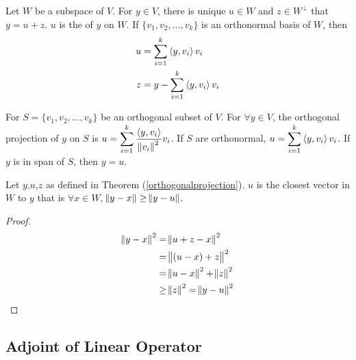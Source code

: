 \begin{theorem}\label{orthogonalprojection}
    Let $W$ be a subspace of $V$. For $y \in V$, there is unique $u \in W$ and $z \in W^\bot$ that $y = u + z$. $u$ is the  of $y$ on $W$. If $\{v_1, v_2, \dots, v_k \}$ is an orthonormal basis of $W$, then 
    \begin{equation}
        \begin{aligned}
            u &= \sum_{i=1}^k \left\langle \displaystyle y, v_i \right\rangle v_i \\
            z &= y -   \sum_{i=1}^k \left\langle \displaystyle y, v_i \right\rangle v_i          
        \end{aligned}
    \end{equation}
\end{theorem}


\begin{theorem}
    For $S=\{v_1, v_2, \dots, v_k \}$ be an orthogonal subset of $V$. For $\forall y \in V$, the orthogonal projection of $y$ on $S$ is $\displaystyle u = \sum_{i=1}^k \frac{\left\langle \displaystyle y, v_i \right\rangle}{\norm{v_i}^2} v_i$. If $S$ are orthonormal, $\displaystyle u = \sum_{i=1}^k \left\langle \displaystyle y, v_i \right\rangle v_i$. If $y$ is in span of $S$, then $y = u$.
\end{theorem}



\begin{theorem}
    Let $y$,$u$,$z$ as defined in Theorem (\ref{orthogonalprojection}). $u$ is the closest vector in $W$ to $y$ that is $\forall x \in W$, $\norm{y-x} \geq \norm{y - u}$.
\end{theorem}
\begin{proof}
    \begin{equation*}
        \begin{aligned}
            \norm{y - x}^2 &= \norm{u + z - x}^2 \\
            &= \norm{(u - x) + z}^2 \\
            &= \norm{u - x}^2 + \norm{z}^2 \\
            &\geq \norm{z}^2 = \norm{y - u}^2
        \end{aligned}
    \end{equation*}
\end{proof}





\subsection{Adjoint of Linear Operator}

